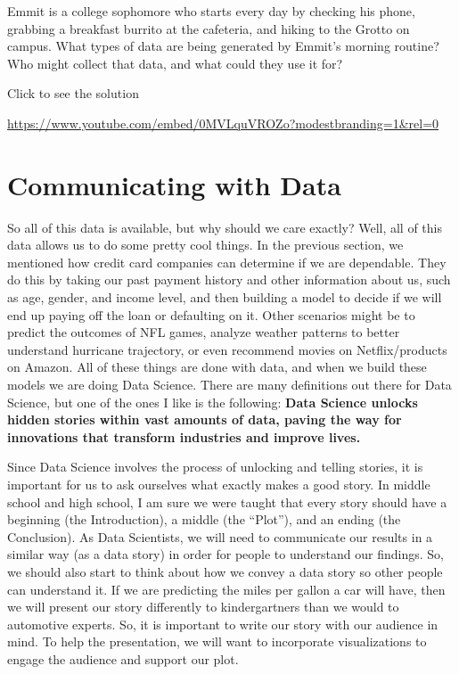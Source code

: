 \documentclass[
  letterpaper,
  DIV=11,
  numbers=noendperiod]{scrreprt}
\begin{document}
\begin{tcolorbox}[enhanced jigsaw, colbacktitle=quarto-callout-tip-color!10!white, breakable, bottomrule=.15mm, colframe=quarto-callout-tip-color-frame, left=2mm, opacitybacktitle=0.6, title=\textcolor{quarto-callout-tip-color}{\faLightbulb}\hspace{0.5em}{Try it Out}, leftrule=.75mm, opacityback=0, rightrule=.15mm, titlerule=0mm, bottomtitle=1mm, colback=white, toprule=.15mm, arc=.35mm, toptitle=1mm, coltitle=black]

Emmit is a college sophomore who starts every day by checking his phone,
grabbing a breakfast burrito at the cafeteria, and hiking to the Grotto
on campus. What types of data are being generated by Emmit's morning
routine? Who might collect that data, and what could they use it for?

Click to see the solution

\url{https://www.youtube.com/embed/0MVLquVROZo?modestbranding=1&rel=0}

\end{tcolorbox}

\section{Communicating with Data}\label{communicating-with-data}

So all of this data is available, but why should we care exactly? Well,
all of this data allows us to do some pretty cool things. In the
previous section, we mentioned how credit card companies can determine
if we are dependable. They do this by taking our past payment history
and other information about us, such as age, gender, and income level,
and then building a model to decide if we will end up paying off the
loan or defaulting on it. Other scenarios might be to predict the
outcomes of NFL games, analyze weather patterns to better understand
hurricane trajectory, or even recommend movies on Netflix/products on
Amazon. All of these things are done with data, and when we build these
models we are doing Data Science. There are many definitions out there
for Data Science, but one of the ones I like is the following:
\textbf{Data Science unlocks hidden stories within vast amounts of data,
paving the way for innovations that transform industries and improve
lives.}

Since Data Science involves the process of unlocking and telling
stories, it is important for us to ask ourselves what exactly makes a
good story. In middle school and high school, I am sure we were taught
that every story should have a beginning (the Introduction), a middle
(the ``Plot''), and an ending (the Conclusion). As Data Scientists, we
will need to communicate our results in a similar way (as a data story)
in order for people to understand our findings. So, we should also start
to think about how we convey a data story so other people can understand
it. If we are predicting the miles per gallon a car will have, then we
will present our story differently to kindergartners than we would to
automotive experts. So, it is important to write our story with our
audience in mind. To help the presentation, we will want to incorporate
visualizations to engage the audience and support our plot.
\end{document}
